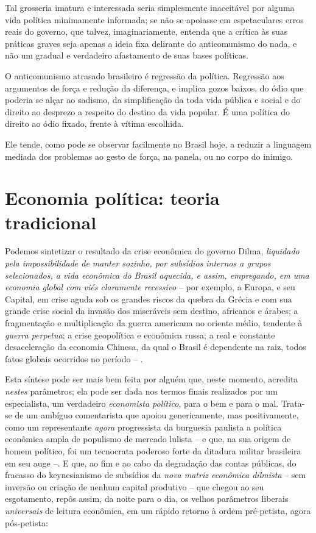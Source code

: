 Tal grosseria imatura e interessada seria simplesmente inaceitável por
alguma vida política minimamente informada; se não se apoiasse em
espetaculares erros reais do governo, que talvez, imaginariamente,
entenda que a crítica às suas práticas graves seja apenas a ideia fixa
delirante do anticomunismo do nada, e não um gradual e verdadeiro
afastamento de suas bases políticas.

O anticomunismo atrasado brasileiro é regressão da política. Regressão
aos argumentos de força e redução da diferença, e implica gozos baixos,
do ódio que poderia se alçar ao sadismo, da simplificação da toda vida
pública e social e do direito ao desprezo a respeito do destino da vida
popular. É uma política do direito ao ódio fixado, frente à vítima
escolhida.

Ele tende, como pode se observar facilmente no Brasil hoje, a reduzir a
linguagem mediada dos problemas ao gesto de força, na panela, ou no
corpo do inimigo.

  \section{Economia política: teoria
  tradicional}\label{economia-poluxedtica-teoria-tradicional}

Podemos sintetizar o resultado da crise econômica do governo Dilma,
\emph{liquidado pela impossibilidade de manter sozinho, por subsídios
internos a grupos selecionados, a vida econômica do Brasil aquecida, e
assim, empregando, em uma economia global com viés claramente recessivo}
-- por exemplo, a Europa, e seu Capital, em crise aguda sob os grandes
riscos da quebra da Grécia e com sua grande crise social da invasão dos
miseráveis sem destino, africanos e árabes; a fragmentação e
multiplicação da guerra americana no oriente médio, tendente à
\emph{guerra perpetua}; a crise geopolítica e econômica russa; a real e
constante desaceleração da economia Chinesa, da qual o Brasil é
dependente na raiz, todos fatos globais ocorridos no período -- .

Esta síntese pode ser mais bem feita por alguém que, neste momento,
acredita \emph{nestes} parâmetros; ela pode ser dada nos termos finais
realizados por um especialista, um verdadeiro \emph{economista
político}, para o bem e para o mal. Trata-se de um ambíguo comentarista
que apoiou genericamente, mas positivamente, como um representante
\emph{agora} progressista da burguesia paulista a política econômica
ampla de populismo de mercado lulista -- e que, na sua origem de homem
político, foi um tecnocrata poderoso forte da ditadura militar
brasileira em seu auge --. E que, ao fim e ao cabo da degradação das
contas públicas, do fracasso do keynesianismo de subsídios da \emph{nova
matriz econômica dilmista} -- sem inversão ou criação de nenhum capital
produtivo -- que chegou ao seu esgotamento, repôs assim, da noite para o
dia, os velhos parâmetros liberais \emph{universais} de leitura
econômica, em um rápido retorno à ordem pré-petista, agora pós-petista:

